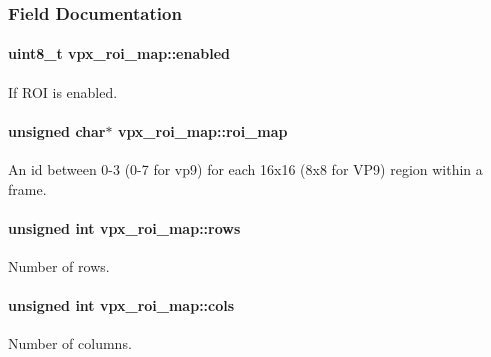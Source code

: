 \subsubsection{Field Documentation}
\paragraph[{\texorpdfstring{enabled}{enabled}}]{\setlength{\rightskip}{0pt plus 5cm}uint8\+\_\+t vpx\+\_\+roi\+\_\+map\+::enabled}\hypertarget{structvpx__roi__map_a2173c817469ff1e6adcd099fc3f0a164}{}\label{structvpx__roi__map_a2173c817469ff1e6adcd099fc3f0a164}
If R\+OI is enabled. 
\paragraph[{\texorpdfstring{roi\+\_\+map}{roi_map}}]{\setlength{\rightskip}{0pt plus 5cm}unsigned char$\ast$ vpx\+\_\+roi\+\_\+map\+::roi\+\_\+map}\hypertarget{structvpx__roi__map_aba69e211b81d622977ba07ac47b61075}{}\label{structvpx__roi__map_aba69e211b81d622977ba07ac47b61075}
An id between 0-\/3 (0-\/7 for vp9) for each 16x16 (8x8 for V\+P9) region within a frame. 
\paragraph[{\texorpdfstring{rows}{rows}}]{\setlength{\rightskip}{0pt plus 5cm}unsigned int vpx\+\_\+roi\+\_\+map\+::rows}\hypertarget{structvpx__roi__map_a3fdcecd472553d08a99ced02cda5c9a6}{}\label{structvpx__roi__map_a3fdcecd472553d08a99ced02cda5c9a6}
Number of rows. 
\paragraph[{\texorpdfstring{cols}{cols}}]{\setlength{\rightskip}{0pt plus 5cm}unsigned int vpx\+\_\+roi\+\_\+map\+::cols}\hypertarget{structvpx__roi__map_a5458459aaf16b14b86fb0adef32757c8}{}\label{structvpx__roi__map_a5458459aaf16b14b86fb0adef32757c8}
Number of columns. 
